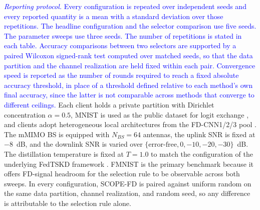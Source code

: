 \documentclass[journal]{IEEEtran}
\newcommand{\rev}[1]{\textcolor{blue}{#1}}
\begin{document}
\rev{\textit{Reporting protocol.} Every configuration is repeated over independent seeds and every reported quantity is a mean with a standard deviation over those repetitions. The headline configuration and the selector comparison use five seeds. The parameter sweeps use three seeds. The number of repetitions is stated in each table. Accuracy comparisons between two selectors are supported by a paired Wilcoxon signed-rank test computed over matched seeds, so that the data partition and the channel realization are held fixed within each pair. Convergence speed is reported as the number of rounds required to reach a fixed absolute accuracy threshold, in place of a threshold defined relative to each method's own final accuracy, since the latter is not comparable across methods that converge to different ceilings.} Each client holds a private partition with Dirichlet concentration $\alpha = 0.5$, MNIST is used as the public dataset for logit exchange \cite{itahara2023distillation}, and clients adopt heterogeneous local architectures from the FD-CNN1/2/3 pool \cite{chan2021fedhe}. The mMIMO BS is equipped with $N_{BS} = 64$ antennas, the uplink SNR is fixed at $-8$~dB, and the downlink SNR is varied over $\{\text{error-free}, 0, -10, -20, -30\}$~dB. The distillation temperature is fixed at $T = 1.0$ to match the configuration of the underlying FedTSKD framework \cite{mu2024fedtskd}.%
FMNIST is the primary benchmark because it offers FD-signal headroom for the selection rule to be observable across both sweeps.%
In every configuration, SCOPE-FD is paired against uniform random on the same data partition, channel realization, and random seed, so any difference is attributable to the selection rule alone. %
\end{document}
